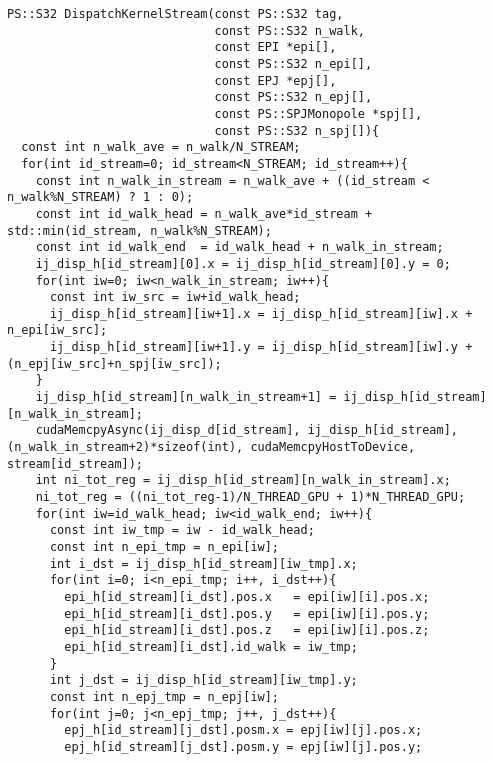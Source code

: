 \documentclass[10pt,onecolumn,a4paper,fleqn]{article}
\begin{document}

\begin{mdframed}[
    backgroundcolor=bg,
    topline=false,
    bottomline=false,
    leftline=false,
    rightline=false]
  \begin{verbatim}
PS::S32 DispatchKernelStream(const PS::S32 tag,
                             const PS::S32 n_walk,
                             const EPI *epi[],
                             const PS::S32 n_epi[],
                             const EPJ *epj[],
                             const PS::S32 n_epj[],
                             const PS::SPJMonopole *spj[],
                             const PS::S32 n_spj[]){
  const int n_walk_ave = n_walk/N_STREAM;
  for(int id_stream=0; id_stream<N_STREAM; id_stream++){
    const int n_walk_in_stream = n_walk_ave + ((id_stream < n_walk%N_STREAM) ? 1 : 0);
    const int id_walk_head = n_walk_ave*id_stream + std::min(id_stream, n_walk%N_STREAM);
    const int id_walk_end  = id_walk_head + n_walk_in_stream;
    ij_disp_h[id_stream][0].x = ij_disp_h[id_stream][0].y = 0;
    for(int iw=0; iw<n_walk_in_stream; iw++){
      const int iw_src = iw+id_walk_head;
      ij_disp_h[id_stream][iw+1].x = ij_disp_h[id_stream][iw].x + n_epi[iw_src];
      ij_disp_h[id_stream][iw+1].y = ij_disp_h[id_stream][iw].y + (n_epj[iw_src]+n_spj[iw_src]);
    }
    ij_disp_h[id_stream][n_walk_in_stream+1] = ij_disp_h[id_stream][n_walk_in_stream];
    cudaMemcpyAsync(ij_disp_d[id_stream], ij_disp_h[id_stream], (n_walk_in_stream+2)*sizeof(int), cudaMemcpyHostToDevice, stream[id_stream]);        
    int ni_tot_reg = ij_disp_h[id_stream][n_walk_in_stream].x;
    ni_tot_reg = ((ni_tot_reg-1)/N_THREAD_GPU + 1)*N_THREAD_GPU;
    for(int iw=id_walk_head; iw<id_walk_end; iw++){
      const int iw_tmp = iw - id_walk_head;
      const int n_epi_tmp = n_epi[iw];
      int i_dst = ij_disp_h[id_stream][iw_tmp].x;
      for(int i=0; i<n_epi_tmp; i++, i_dst++){
        epi_h[id_stream][i_dst].pos.x   = epi[iw][i].pos.x;
        epi_h[id_stream][i_dst].pos.y   = epi[iw][i].pos.y;
        epi_h[id_stream][i_dst].pos.z   = epi[iw][i].pos.z;
        epi_h[id_stream][i_dst].id_walk = iw_tmp;
      }
      int j_dst = ij_disp_h[id_stream][iw_tmp].y;
      const int n_epj_tmp = n_epj[iw];
      for(int j=0; j<n_epj_tmp; j++, j_dst++){
        epj_h[id_stream][j_dst].posm.x = epj[iw][j].pos.x;
        epj_h[id_stream][j_dst].posm.y = epj[iw][j].pos.y;

\end{verbatim}
\end{mdframed}
\end{document}

